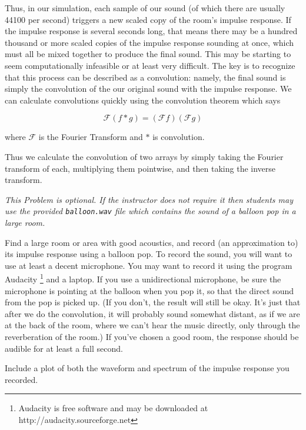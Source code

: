 Thus, in our simulation, each sample of our sound (of which there are usually 44100 per second) triggers a new scaled copy of the room's impulse response.
If the impulse response is several seconds long, that means there may be a hundred thousand or more scaled copies of the impulse response sounding at once, which must all be mixed together to produce the final sound.
This may be starting to seem computationally infeasible or at least very difficult.
The key is to recognize that this process can be described as a convolution: namely, the final sound is simply the convolution of the our original sound with the impulse response.
We can calculate convolutions quickly using the convolution theorem which says

\[\mathcal{F}(f \ast g) = (\mathcal{F} f) (\mathcal{F} g)\]

where $\mathcal{F}$ is the Fourier Transform and $\ast$ is convolution.

Thus we calculate the convolution of two arrays by simply taking the Fourier transform of each, multiplying them pointwise, and then taking the inverse transform.

\begin{problem}
\emph{This Problem is optional.  If the instructor does not require it then students may use the provided \texttt{balloon.wav} file which contains the sound of a balloon pop in a large room.}

Find a large room or area with good acoustics, and record (an approximation to) its impulse response using a balloon pop.
To record the sound, you will want to use at least a decent microphone.
You may want to record it using the program Audacity \footnote{Audacity is free software and may be downloaded at http://audacity.sourceforge.net} and a laptop.
If you use a unidirectional microphone, be sure the microphone is pointing at the balloon when you pop it, so that the direct sound from the pop is picked up.
(If you don't, the result will still be okay.
It's just that after we do the convolution, it will probably sound somewhat distant, as if we are at the back of the room, where we can't hear the music directly, only through the reverberation of the room.)
If you've chosen a good room, the response should be audible for at least a full second.

Include a plot of both the waveform and spectrum of the impulse response you recorded.
\end{problem}


